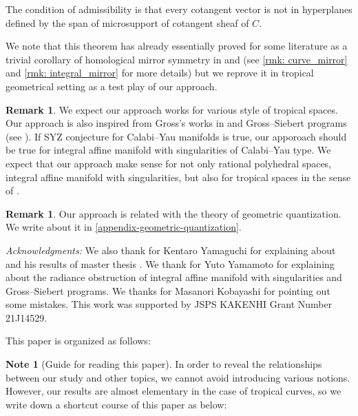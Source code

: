 \documentclass[a4paper,dvipdfmx,reqno,12pt]{amsart}
\theoremstyle{definition}
\newtheorem{Note}[theorem]{Note}
\newtheorem{remark}[theorem]{Remark}
\numberwithin{equation}{section}
\begin{document}
The condition of admissibility is that every cotangent vector 
is not in hyperplanes defined by the span of microsupport of
cotangent sheaf of $C$. 


We note that this theorem has already essentially proved for some
literature as a trivial corollary of homological mirror symmetry 
in \cite{MR4301560} and \cite{auroux2022lagrangian} (see \cref{rmk: curve_mirror} and \cref{rmk: integral_mirror} 
for more details) but we reprove it in tropical  
geometrical setting as a test play of our approach.

\begin{remark}
We expect our approach works for various style 
of tropical spaces. 
Our approach is 
also inspired from Gross's 
works in 
\cite{grossSpecialLagrangianFibrations1998a} 
and Gross--Siebert programs
(see \cite[Conjecture 1.6]{MR3525095}).
If SYZ conjecture for Calabi--Yau manifolds
is true, our apporoach should
be true for integral affine manifold 
with singularities of Calabi--Yau type.
We expect that 
our approach make sense for not only rational polyhedral
spaces, integral affine manifold with singularities,
but also for tropical spaces 
in the sense of \cite[Definition 2.8]{cavalieri2020tropical}.

\end{remark}

\begin{remark}
Our approach is related with the theory of
geometric quantization. We write about it in 
\cref{appendix-geometric-quantization}.
\end{remark}

\textit{Acknowledgments:}
We also thank for Kentaro Yamaguchi for explaining about
\cite{MR4234675} and his results of master thesis 
\cite{yamaguchimaster}. We thank for Yuto Yamamoto for
explaining about the radiance obstruction of integral 
affine manifold with singularities and Gross--Siebert
programs. We thanks for Masanori Kobayashi for 
pointing out some mistakes. 
This work was supported by JSPS KAKENHI 
Grant Number 21J14529.

This paper is organized as follows:

\begin{Note}[Guide for reading this paper]
  In order to reveal the relationships between our study
  and other topics, we cannot avoid introducing various
  notions. However, our results are almost elementary
in the case of tropical curves,
  so we write down a shortcut course of this paper as below:
\end{Note}
\end{document}
